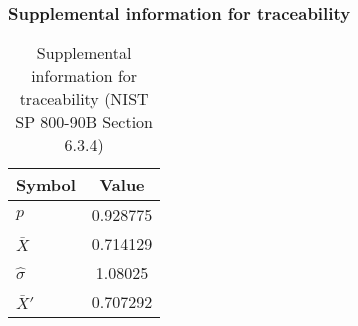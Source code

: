 \documentclass[a3paper,xelatex,english]{bxjsarticle}
\begin{document}
\subsubsection{Supplemental information for traceability}
\renewcommand{\arraystretch}{1.8}
\begin{table}[h]
\caption{Supplemental information for traceability (NIST SP 800-90B Section 6.3.4)}
\begin{center}
\begin{tabular}{|l|c|}
\hline 
\rowcolor{anotherlightblue} %
Symbol				& Value \\ \hline 
$p$				& 0.928775\\ \hline 
$\bar{X}$ 		& 0.714129\\ \hline
$\hat{\sigma}$		&  1.08025\\ \hline
$\bar{X}'$ 		& 0.707292\\ \hline
\end{tabular}
\end{center}
\end{table}
\renewcommand{\arraystretch}{1.4}
\clearpage
\end{document}
